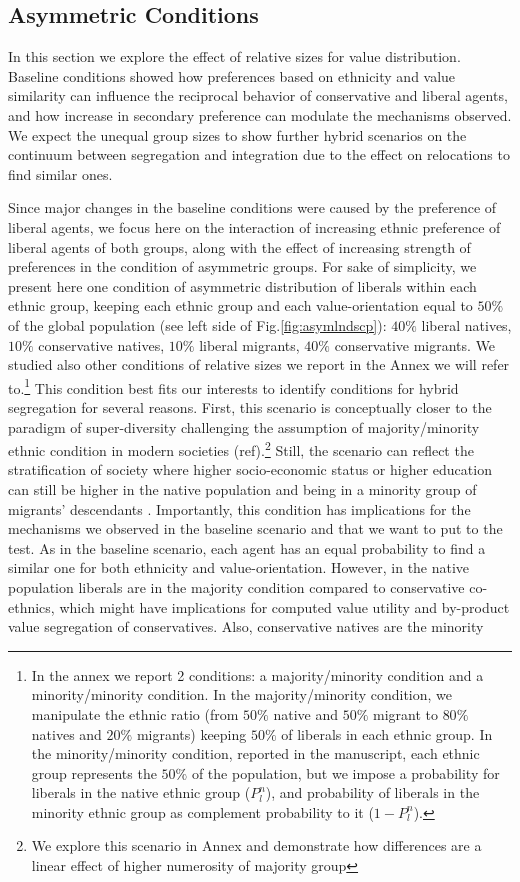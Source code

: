 \documentclass[
]{article}
\begin{document}
\subsection{Asymmetric Conditions}

In this section we explore the effect of relative sizes for value distribution. Baseline conditions showed how preferences based on ethnicity and value similarity can influence the reciprocal behavior of conservative and liberal agents, and how increase in secondary preference can modulate the mechanisms observed. We expect the unequal group sizes to show further hybrid scenarios on the continuum between segregation and integration due to the effect on relocations to find similar ones. 

Since major changes in the baseline conditions were caused by the preference of liberal agents, we focus here on the interaction of increasing ethnic preference of liberal agents of both groups, along with the effect of increasing strength of preferences in the condition of asymmetric groups. For sake of simplicity, we present here one condition of asymmetric distribution of liberals within each ethnic group, keeping each ethnic group and each value-orientation equal to $50\%$ of the global population (see left side of Fig.\ref{fig:asymlndscp}):  $40\%$ liberal natives, $10\%$ conservative natives, $10\%$ liberal migrants, $40\%$ conservative migrants. We studied also other conditions of relative sizes we report in the Annex we will refer to.\footnote{In the annex we report 2 conditions: a majority/minority condition and a minority/minority condition. In the majority/minority condition, we manipulate the ethnic ratio (from $50\%$ native and $50\%$ migrant to $80\%$ natives and $20\%$ migrants) keeping $50\%$ of liberals in each ethnic group. In the minority/minority condition, reported in the manuscript, each ethnic group represents the $50\%$ of the population, but we impose a probability for liberals in the native ethnic group ($P^{n}_{l}$), and probability of liberals in the minority ethnic group as complement probability to it ($1 - P^{n}_{l}$).} This condition best fits our interests to identify conditions for hybrid segregation for several reasons. First, this scenario is conceptually closer to the paradigm of super-diversity challenging the assumption of majority/minority ethnic condition in modern societies (ref).\footnote{We explore this scenario in Annex and demonstrate how differences are a linear effect of higher numerosity of majority group} Still, the scenario can reflect the stratification of society where higher socio-economic status or higher education can still be higher in the native population and being in a minority group of migrants' descendants \citep{crul2017upcoming}. Importantly, this condition has implications for the mechanisms we observed in the baseline scenario and that we want to put to the test. As in the baseline scenario, each agent has an equal probability to find a similar one for both ethnicity and value-orientation. However, in the native population liberals are in the majority condition compared to conservative co-ethnics, which might have implications for computed value utility and by-product value segregation of conservatives. Also, conservative natives are the minority 
\end{document}

